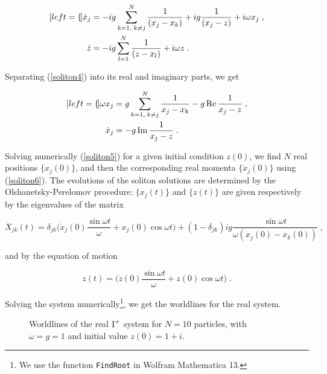 \begin{subequations}
\begin{align}[left=\empheqlbrace]
\dot x_j &= -ig \sum_{k=1,\;k \neq j}^N \frac{1}{(x_j - x_k)} + ig \frac{1}{(x_j - z)} + i\omega x_j \label{soliton4}\;,\\
\dot z &= - ig \sum_{l=1}^N \frac{1}{(z - x_l)} + i\omega z\;.
\end{align}
\end{subequations}

Separating (\ref{soliton4}) into its real and imaginary parts, we get

\begin{subequations}
\begin{align}[left=\empheqlbrace]
    \omega x_j &= g\sum_{k=1,\;k \neq j}^N \frac{1}{x_j - x_k} - g \operatorname{Re}{\frac{1}{x_j - z}} \label{soliton5}\;, \\
    \dot x_j &= - g \operatorname{Im}{\frac{1}{x_j - z}} \label{soliton6}\;.
\end{align}
\end{subequations}

Solving numerically (\ref{soliton5}) for a given initial condition $z(0)$, we find $N$ real positions $\{x_j(0)\}$, and then the corresponding real momenta $\{\dot x_j(0)\}$ using (\ref{soliton6}). The evolutions of the soliton solutions are determined by the Olshanetsky-Perelomov procedure: $\{x_j(t)\}$ and $\{z(t)\}$ are given respectively by the eigenvalues of the matrix

\begin{equation}
    X_{jk} (t) = \delta_{jk} \Big (\dot x_j(0)\frac{\sin{\omega t}}{\omega} + x_j (0)\cos{\omega t} \Big ) + (1 - \delta_{jk}) ig \frac{\sin{\omega t}}{\omega(x_j(0) - x_k(0))}\;,
\end{equation}

and by the equation of motion

\begin{equation}
    z(t) = \Big (\dot z(0)\frac{\sin{\omega t}}{\omega} + z(0)\cos{\omega t} \Big ) \;.
\end{equation}

Solving the system numerically\footnote{We use the function \texttt{FindRoot} in Wolfram Mathematica 13.}, we get the worldlines for the real system.

\begin{figure}[H]
    \centering
    \caption{Worldlines of the real $\textnormal{I}^+$ system for $N = 10$ particles, with $\omega = g = 1$ and initial value $z(0) = 1 + i$.}
    \label{fig:my_label}
\end{figure}

